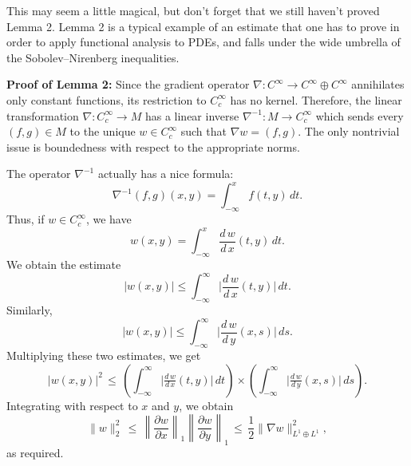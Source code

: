 \documentclass[12pt]{article}
\begin{document}
This may seem a little magical, but don’t forget that we still haven’t proved Lemma 2. Lemma 2 is a typical example of an estimate that one has to prove in order to apply functional analysis to PDEs, and falls under the wide umbrella of the Sobolev–Nirenberg inequalities.

\medskip
\noindent
\textbf{Proof of Lemma 2:} Since the gradient operator \(\nabla : C^\infty \to C^\infty \oplus C^\infty\) annihilates only constant functions, its restriction to \(C_c^\infty\) has no kernel. Therefore, the linear transformation \(\nabla : C_c^\infty \to M\) has a linear inverse \(\nabla^{-1} : M \to C_c^\infty\) which sends every \((f,g) \in M\) to the unique \(w \in C_c^\infty\) such that \(\nabla w = (f,g)\). The only nontrivial issue is boundedness with respect to the appropriate norms.

The operator \(\nabla^{-1}\) actually has a nice formula:
\[
\nabla^{-1}(f,g)(x,y) = \int_{-\infty}^x f(t,y)\, dt.
\]
Thus, if \(w \in C_c^\infty\), we have
\[
w(x,y) = \int_{-\infty}^x \frac{d\,w}{d\,x}(t,y)\, dt.
\]
We obtain the estimate
\[
|w(x,y)| \le \int_{-\infty}^\infty 
\biggl|\frac{d\,w}{d\,x}(t,y)\biggr|\,
dt.
\]
Similarly,
\[
|w(x,y)| \le \int_{-\infty}^\infty
\biggl|\frac{d\,w}{d\,y}(x,s)\biggr|\, ds.
\]
Multiplying these two estimates, we get
\[
|w(x,y)|^2 \,\le\,
\left(\int_{-\infty}^\infty 
\bigl|\tfrac{d\,w}{d\,x}(t,y)\bigr|\,
dt\right)
\times
\left(\int_{-\infty}^\infty 
\bigl|\tfrac{d\,w}{d\,y}(x,s)\bigr|\,
ds\right).
\]
Integrating with respect to \(x\) and \(y\), we obtain
\[
\|w\|_2^2 \,\le\,
\left\|\frac{\partial w}{\partial x}\right\|_1
\left\|\frac{\partial w}{\partial y}\right\|_1
\,\le\, \frac12
\|\nabla w\|_{L^1 \oplus L^1}^2,
\]
as required.
\end{document}
